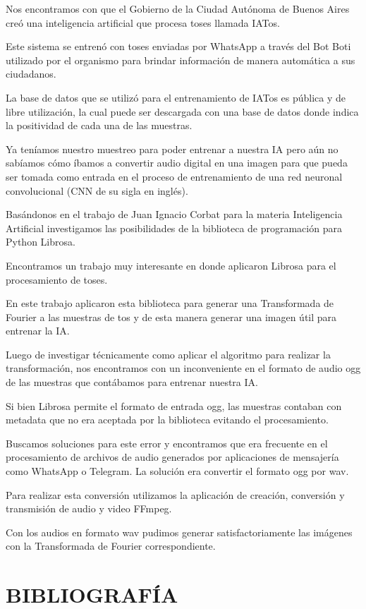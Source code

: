\documentclass[journal]{IEEEtran}
\begin{document}
Nos encontramos con que el Gobierno de la Ciudad Autónoma de Buenos Aires creó una inteligencia artificial que procesa toses llamada IATos.

Este sistema se entrenó con toses enviadas por WhatsApp a través del Bot Boti utilizado por el organismo para brindar información de manera automática a sus ciudadanos.

La base de datos que se utilizó para el entrenamiento de IATos es pública y de libre utilización, la cual puede ser descargada con una base de datos donde indica la positividad de cada una de las muestras.

Ya teníamos nuestro muestreo para poder entrenar a nuestra IA pero aún no sabíamos cómo íbamos a convertir audio digital en una imagen para que pueda ser tomada como entrada en el proceso de entrenamiento de una red neuronal convolucional (CNN de su sigla en inglés).

Basándonos en el trabajo de Juan Ignacio Corbat para la materia Inteligencia Artificial investigamos las posibilidades de la biblioteca de programación para Python Librosa.

Encontramos un trabajo muy interesante en donde aplicaron Librosa para el procesamiento de toses.

{En este trabajo aplicaron esta biblioteca para generar una Transformada de Fourier a las muestras de tos y de esta manera generar una imagen útil para entrenar la IA.}

Luego de investigar técnicamente como aplicar el algoritmo para realizar la transformación, nos encontramos con un inconveniente en el formato de audio ogg de las muestras que contábamos para entrenar nuestra IA.

Si bien Librosa permite el formato de entrada ogg, las muestras contaban con metadata que no era aceptada por la biblioteca evitando el procesamiento.

Buscamos soluciones para este error y encontramos que era frecuente en el procesamiento de archivos de audio generados por aplicaciones de mensajería como WhatsApp o Telegram. La solución era convertir el formato ogg por wav.

Para realizar esta conversión utilizamos la aplicación de creación, conversión y transmisión de audio y video FFmpeg.

Con los audios en formato wav pudimos generar satisfactoriamente las imágenes con la Transformada de Fourier correspondiente.

\section{BIBLIOGRAFÍA}
\printbibliography[heading=none]
\end{document}
